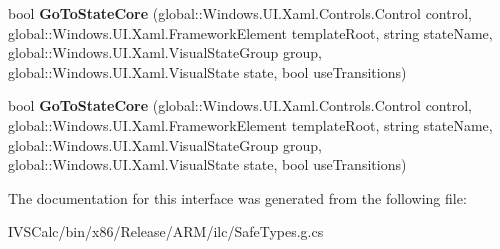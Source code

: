 \begin{DoxyCompactItemize}
\item 
\mbox{\label{interface_windows_1_1_u_i_1_1_xaml_1_1_i_visual_state_manager_overrides_ae08855887112e856da7787e0f740ee46}} 
bool {\bfseries Go\+To\+State\+Core} (global\+::\+Windows.\+U\+I.\+Xaml.\+Controls.\+Control control, global\+::\+Windows.\+U\+I.\+Xaml.\+Framework\+Element template\+Root, string state\+Name, global\+::\+Windows.\+U\+I.\+Xaml.\+Visual\+State\+Group group, global\+::\+Windows.\+U\+I.\+Xaml.\+Visual\+State state, bool use\+Transitions)
\item 
\mbox{\label{interface_windows_1_1_u_i_1_1_xaml_1_1_i_visual_state_manager_overrides_ae08855887112e856da7787e0f740ee46}} 
bool {\bfseries Go\+To\+State\+Core} (global\+::\+Windows.\+U\+I.\+Xaml.\+Controls.\+Control control, global\+::\+Windows.\+U\+I.\+Xaml.\+Framework\+Element template\+Root, string state\+Name, global\+::\+Windows.\+U\+I.\+Xaml.\+Visual\+State\+Group group, global\+::\+Windows.\+U\+I.\+Xaml.\+Visual\+State state, bool use\+Transitions)
\end{DoxyCompactItemize}


The documentation for this interface was generated from the following file\+:\begin{DoxyCompactItemize}
\item 
I\+V\+S\+Calc/bin/x86/\+Release/\+A\+R\+M/ilc/Safe\+Types.\+g.\+cs\end{DoxyCompactItemize}
